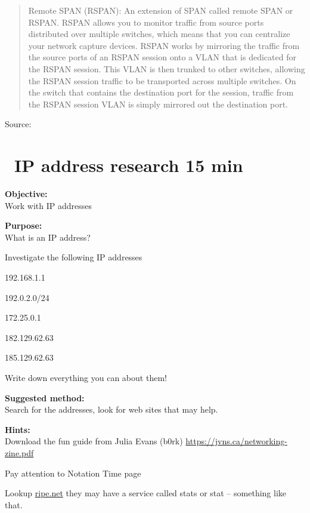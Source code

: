 \documentclass[a4paper,11pt,notitlepage]{report}
\begin{document}
\begin{quote}
Remote SPAN (RSPAN): An extension of SPAN called remote SPAN or RSPAN. RSPAN allows you to monitor traffic from source ports distributed over multiple switches, which means that you can centralize your network capture devices. RSPAN works by mirroring the traffic from the source ports of an RSPAN session onto a VLAN that is dedicated for the RSPAN session. This VLAN is then trunked to other switches, allowing the RSPAN session traffic to be transported across multiple switches. On the switch that contains the destination port for the session, traffic from the RSPAN session VLAN is simply mirrored out the destination port.
\end{quote}
Source: {\small{}}




\chapter{\faExclamationTriangle\ IP address research 15 min}
\label{ex:ip-address-research}

{\bf Objective:}\\
Work with IP addresses

{\bf Purpose:}\\
What is an IP address?

Investigate the following IP addresses
\begin{list2}
\item 192.168.1.1
\item 192.0.2.0/24
\item 172.25.0.1
\item 182.129.62.63
\item 185.129.62.63
\end{list2}

Write down everything you can about them!

{\bf Suggested method:}\\
Search for the addresses, look for web sites that may help.

{\bf Hints:}\\
Download the fun guide from Julia Evans (b0rk) \url{https://jvns.ca/networking-zine.pdf}

Pay attention to Notation Time page

Lookup \url{ripe.net} they may have a service called stats or stat -- something like that.
\end{document}
